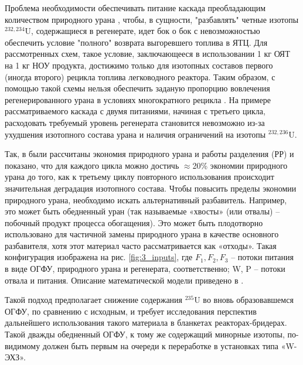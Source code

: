 Проблема необходимости обеспечивать питание каскада преобладающим количеством природного урана , чтобы, в сущности, "разбавлять" четные изотопы  $^{232,234}$U, содержащиеся в регенерате, идет бок о бок с невозможностью обеспечить условие "полного" возврата выгоревшего топлива в ЯТЦ.
Для рассмотренных схем, такое условие, заключающееся в использовании 1 кг ОЯТ на 1 кг НОУ продукта, достижимо только для изотопных составов первого (иногда второго) рецикла топлива легководного реактора.
Таким образом, с помощью такой схемы нельзя обеспечить заданую пропорцию вовлечения регенерированного урана в условиях многократного рецикла \cite{smirnovApplyingEnrichmentCapacities2018}.
На примере рассматриваемого каскада с двумя питаниями, начиная с третьего цикла, расходовать требуемый уровень регенерата становится невозможно из-за ухудшения изотопного состава урана и наличия ограничений на изотопы $^{232,236}$U.

Так, в \cite{smirnovApplyingEnrichmentCapacities2018} были рассчитаны экономия природного урана и работы разделения (РР) и показано, что для каждого цикла можно достичь $\approx$20\% экономии природного урана до того, как к третьему циклу повторного использования происходит значительная деградация изотопного состава.
Чтобы повысить пределы экономии природного урана, необходимо искать альтернативный разбавитель. Например, это может быть обедненный уран (так называемые «хвосты» (или отвалы) -- побочный продукт процесса обогащения). Это может быть плодотворно использовано для частичной замены природного урана в качестве основного разбавителя, хотя этот материал часто рассматривается как «отходы». Такая конфигурация изображена на рис. \ref{fig:3_inputs}, где $F_{1}, F_{2}, F_{3}$ -- потоки питания в виде ОГФУ, природного урана и регенерата, соответственно; W, P -- потоки отвала и питания. Описание математической модели приведено в \cite{smirnovEnrichmentRegeneratedUranium2014}.

Такой подход предполагает снижение содержания $^{235}$U во вновь образовавшемся ОГФУ, по сравнению с исходным, и требует исследования перспектив дальнейшего использования такого материала в бланкетах реакторах-бридерах. Такой дважды обедненный ОГФУ, к тому же содержащий минорные изотопы, по-видимому должен быть первым на очереди к переработке в установках типа «W-ЭХЗ».

